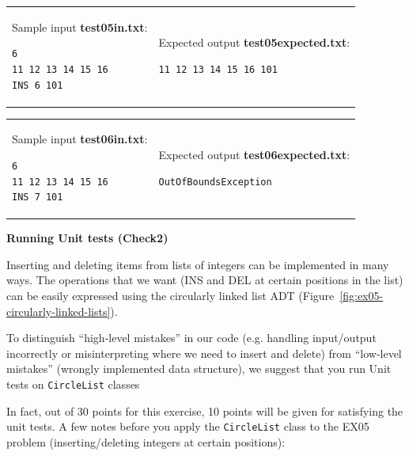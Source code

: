 \documentclass[11pt]{article}
\begin{document}
\vspace{10pt}
\begin{tabular}{@{}ll@{}}
\begin{minipage}[t]{0.49\columnwidth}
Sample input {\bf test05in.txt}:
\begin{verbatim}
6
11 12 13 14 15 16
INS 6 101
\end{verbatim}
\end{minipage} 
&
\begin{minipage}[t]{0.49\columnwidth}
Expected output {\bf test05expected.txt}:
\begin{verbatim}
11 12 13 14 15 16 101
\end{verbatim}
\end{minipage} 
\end{tabular}


\vspace{10pt}
\begin{tabular}{@{}ll@{}}
\begin{minipage}[t]{0.49\columnwidth}
Sample input {\bf test06in.txt}:
\begin{verbatim}
6
11 12 13 14 15 16
INS 7 101
\end{verbatim}
\end{minipage} 
&
\begin{minipage}[t]{0.49\columnwidth}
Expected output {\bf test06expected.txt}:
\begin{verbatim}
OutOfBoundsException
\end{verbatim}
\end{minipage} 
\end{tabular}






\vspace{10pt}
{\bf Running Unit tests (Check2)}

Inserting and deleting items from lists of integers 
can be implemented in many ways. 
The operations that we want 
(INS and DEL at certain positions in the list) can be 
easily expressed using the circularly linked list ADT
(Figure~\ref{fig:ex05-circularly-linked-lists}). 

To distinguish ``high-level mistakes'' in our code
(e.g. handling input/output incorrectly or misinterpreting where
we need to insert and delete) from ``low-level mistakes'' 
(wrongly implemented data structure), we suggest 
that you run Unit tests on {\tt CircleList} classes

In fact, out of 30 points for this exercise, 10 points will be
given for satisfying the unit tests. 
A few notes before you apply the {\tt CircleList} class to 
the EX05 problem (inserting/deleting integers at certain positions): 
\end{document}
